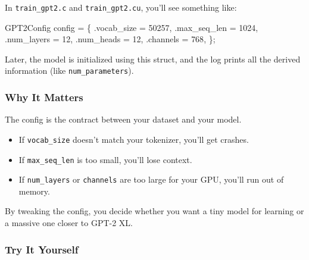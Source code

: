\documentclass[
  letterpaper,
  DIV=11,
  numbers=noendperiod]{scrreprt}
\newenvironment{Shaded}{\begin{snugshade}}{\end{snugshade}}
\newcommand{\DecValTok}[1]{\textcolor[rgb]{0.68,0.00,0.00}{#1}}
\newcommand{\NormalTok}[1]{\textcolor[rgb]{0.00,0.23,0.31}{#1}}
\newcommand{\OperatorTok}[1]{\textcolor[rgb]{0.37,0.37,0.37}{#1}}
\providecommand{\tightlist}{%
  \setlength{\itemsep}{0pt}\setlength{\parskip}{0pt}}
\begin{document}
In \texttt{train\_gpt2.c} and \texttt{train\_gpt2.cu}, you'll see
something like:

\begin{Shaded}
\begin{Highlighting}[]
\NormalTok{GPT2Config config }\OperatorTok{=} \OperatorTok{\{}
    \OperatorTok{.}\NormalTok{vocab\_size }\OperatorTok{=} \DecValTok{50257}\OperatorTok{,}
    \OperatorTok{.}\NormalTok{max\_seq\_len }\OperatorTok{=} \DecValTok{1024}\OperatorTok{,}
    \OperatorTok{.}\NormalTok{num\_layers }\OperatorTok{=} \DecValTok{12}\OperatorTok{,}
    \OperatorTok{.}\NormalTok{num\_heads }\OperatorTok{=} \DecValTok{12}\OperatorTok{,}
    \OperatorTok{.}\NormalTok{channels }\OperatorTok{=} \DecValTok{768}\OperatorTok{,}
\OperatorTok{\};}
\end{Highlighting}
\end{Shaded}

Later, the model is initialized using this struct, and the log prints
all the derived information (like \texttt{num\_parameters}).

\subsubsection{Why It Matters}\label{why-it-matters-9}

The config is the contract between your dataset and your model.

\begin{itemize}
\tightlist
\item
  If \texttt{vocab\_size} doesn't match your tokenizer, you'll get
  crashes.
\item
  If \texttt{max\_seq\_len} is too small, you'll lose context.
\item
  If \texttt{num\_layers} or \texttt{channels} are too large for your
  GPU, you'll run out of memory.
\end{itemize}

By tweaking the config, you decide whether you want a tiny model for
learning or a massive one closer to GPT-2 XL.

\subsubsection{Try It Yourself}\label{try-it-yourself-10}
\end{document}
